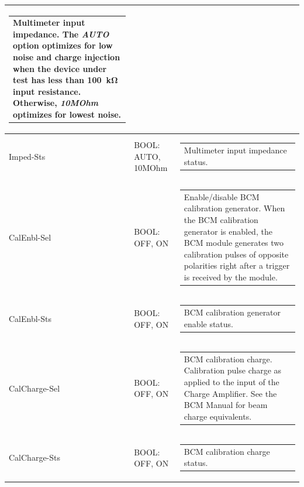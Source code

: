 \documentclass[openany]{article}
\begin{document}
\begin{longtable}{| m{3.0cm} m{4.5cm} m{7.0cm} |}
\begin{tabular}{@{}m{6cm}@{}}
	    					Multimeter input impedance. The \emph{AUTO} option optimizes for low noise and charge injection when the device under test has less than \SI{100}{\kohm} input resistance. Otherwise, \emph{10MOhm} optimizes for lowest noise.
						\end{tabular} \\ \hline
		Imped-Sts & BOOL: AUTO, 10MOhm & \begin{tabular}{@{}m{6cm}@{}}
	    					Multimeter input impedance status.
						\end{tabular} \\ \hline
		CalEnbl-Sel & BOOL: OFF, ON & \begin{tabular}{@{}m{6cm}@{}}
	    					Enable/disable BCM calibration generator. When the BCM calibration generator is enabled, the BCM module generates two calibration pulses of opposite polarities right after a trigger is received by the module.
						\end{tabular} \\ \hline
		CalEnbl-Sts & BOOL: OFF, ON & \begin{tabular}{@{}m{6cm}@{}}
 						BCM calibration generator enable status.
						\end{tabular} \\ \hline
		CalCharge-Sel & BOOL: OFF, ON & \begin{tabular}{@{}m{6cm}@{}}
	    					BCM calibration charge. Calibration pulse charge as applied to the input of the Charge Amplifier. See the BCM Manual for beam charge equivalents.
						\end{tabular} \\ \hline
		CalCharge-Sts & BOOL: OFF, ON & \begin{tabular}{@{}m{6cm}@{}}
 						BCM calibration charge status.
						\end{tabular} \\ \hline
	\end{longtable}
\end{document}
